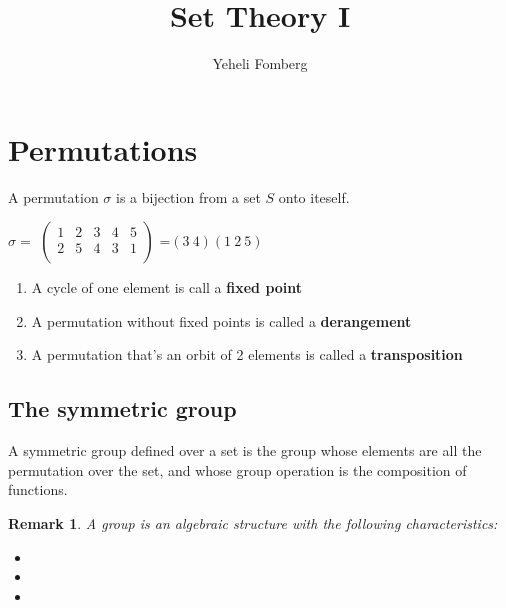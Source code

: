 \documentclass{article}
\title{\textbf{Set Theory I}}
\author{Yeheli Fomberg}
\date{}
\theoremstyle{plain}
\newtheorem{remark}{Remark}[section]
\begin{document}
\maketitle
\newpage
\tableofcontents
\newpage
\section{Permutations}
	A permutation $\sigma$ is a bijection from a set $S$ onto iteself.
	\begin{center}
		$\sigma=$
			$\begin{pmatrix}
				1 & 2 & 3 & 4 & 5\\
				2 & 5 & 4 & 3 & 1\\
			\end{pmatrix}$
		=$(3 \ 4)(1 \ 2 \ 5)$
	\end{center}
	\begin{enumerate}
		\item A cycle of one element is call a \textbf{fixed point}
		\item A permutation without fixed points is called a 
		\textbf{derangement}
		\item A permutation that's an orbit of 2 elements is called a 
		\textbf{transposition}
	\end{enumerate}
	
	\subsection{The symmetric group}
	A symmetric group defined over a set is the group whose elements are 
	all the permutation over the set, and whose group operation is the 
	composition of functions.
	\begin{remark}
	A group is an algebraic structure with the following 
	characteristics:
	\end{remark}
	\begin{itemize}
		\item {}
		\item {}
		\item {}
	\end{itemize}
		
	\newpage
\end{document}
